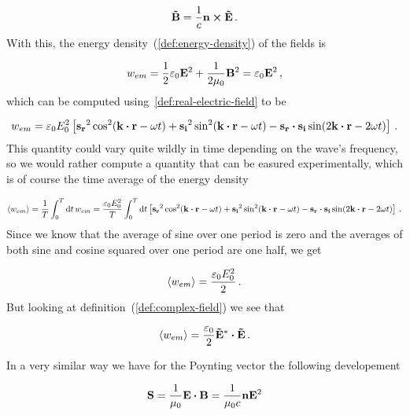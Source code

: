 \documentclass[12pt, class=report, crop=false]{standalone}
\begin{document}
\begin{equation}
  \vb{\tilde{B}} = \frac{1}{c} \vb{n}\cp\vb{\tilde{E}} \,.
\end{equation}
With this, the energy density~(\ref{def:energy-density}) of the fields is

\begin{equation}
  w_{em} = \frac{1}{2} \varepsilon_0 \vb{E}^2+ \frac{1}{2\mu_0} \vb{B}^2 = \varepsilon_0 \vb{E}^2 \,,
\end{equation}
which can be computed using~\cref{def:real-electric-field} to be

\begin{equation}
  w_{em} = \varepsilon_0 E_{0}^{2} \left[ \vb{s_r}^2 \cos[2](\vb{k}\vdot\vb{r}-\omega t) + \vb{s_i}^2 \sin[2](\vb{k}\vdot\vb{r}-\omega t) - \vb{s_r}\vdot\vb{s_i} \sin(2\vb{k}\vdot \vb{r} - 2 \omega t) \right] \,.
\end{equation}
This quantity could vary quite wildly in time depending on the wave's frequency, so we would rather compute a quantity that can be easured experimentally, which is of course the time average of the energy density

\begin{equation}
  \expval{w_{em}} = \frac{1}{T} \int_{0}^{T} \dd{t} w_{em} = \frac{\varepsilon_0 E_0^2}{T} \int_{0}^{T} \dd{t} \left[ \vb{s_r}^2 \cos[2](\vb{k}\vdot\vb{r}-\omega t) + \vb{s_i}^2 \sin[2](\vb{k}\vdot\vb{r}-\omega t) - \vb{s_r}\vdot\vb{s_i} \sin(2\vb{k}\vdot \vb{r} - 2 \omega t) \right] \,.
\end{equation}
Since we know that the average of sine over one period is zero and the averages of both sine and cosine squared over one period are one half, we get

\begin{equation}
  \expval{w_{em}} = \frac{\varepsilon_0 E_0^2}{2} \,.
\end{equation}
But looking at definition~(\ref{def:complex-field}) we see that

\begin{equation}
  \expval{w_{em}} = \frac{\varepsilon_0}{2} \vb{\tilde{E}^*} \vdot \vb{\tilde{E}} \,.
\end{equation}

\par
In a very similar way we have for the Poynting vector the following developement

\begin{equation}
  \vb{S} = \frac{1}{\mu_0} \vb{E}\vdot\vb{B} = \frac{1}{\mu_0 c} \vb{n} \vb{E}^2
\end{equation}
\end{document}
